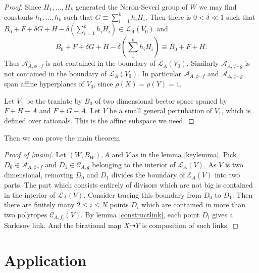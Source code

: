 \documentclass{article}
\begin{document}
\begin{proof}
Since $H_{1},\ldots ,H_{k}$ generated the Neron-Severi group of $W$ we may find constants $h_{1},\ldots ,h_{k}$ such that $G \equiv \sum^{k}_{i=1} h_{i}H_{i}$. Then there is $0< \delta\ll 1$ such that  $B_{0}+F+\delta G+H- \delta(\sum_{i=1}^{k} h_{i}H_{i}) \in \mathcal{L}_{A}(V_{0})$ and
\[
  B_{0}+F+\delta G+H-\delta (\sum_i^k h_{i}H_{i}) \equiv B_{0}+F+H
.\]
Thus $\mathcal{A}_{A,\phi\circ f}$ is not contained in the boundary of $\mathcal{L}_{A}(V_{0})$. Similarly $\mathcal{A}_{A,\psi\circ g}$ is not contained in the boundary of $\mathcal{L}_{A}(V_{0})$. In particular $\mathcal{A}_{A,\phi\circ f}$ and   $\mathcal{A}_{A,\psi\circ g}$ span affine hyperplanes of $V_{0}$, since $\rho(X)=\rho(Y)=1$.

Let $V_{1}$ be the tranlate by $B_{0}$ of two dimensional bector space spaned by $F+H-A$ and $F+G-A$. Let $V$ be a small general pertubation of $V_{1}$, which is defined over rationals. This is the affine subspace we need.
\end{proof}
Then we can prove the main theorem
\begin{proof}[Proof of \ref{main}]
Let $(W,B_{W}),A $ and $V$ as in the lemma \ref{keylemma}.  Pick $ D_{0} \in \mathcal{A}_{A,\phi\circ f} $  and $ D_1\in \mathcal{C}_{A,g} $ belonging to the interior of $ \mathcal{L}_A(V) $. As $ V $ is two dimensional, removing $ D_0 $ and $ D_1 $ divides the boundary of $ \mathcal{E}_A(V) $ into two parts. The part which consists entirely of divisors which are not big is contained in the interior of $ \mathcal{L}_A(V) $. Consider tracing this boundary from $ D_0 $ to $ D_1 $. Then there are finitely many $ 2\leqslant i\leqslant N $ points $ D_i $ which are contained in more than two polytopes $ \mathcal{C}_{A,f_i}(V) $. By lemma \ref{constructlink},  each point $ D_i $ gives a Sarkisov link. And the birational map $X \dashrightarrow Y$ is composition of such links.
\end{proof}


\section{Application}


\end{document}
